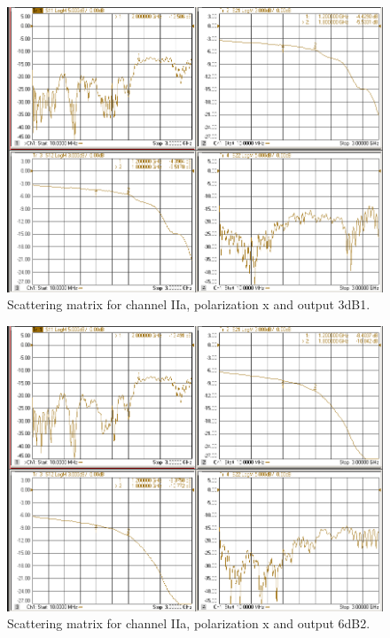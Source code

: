 \documentclass[12pt,a4paper,oneside]{article}
\begin{document}
\begin{figure}[H]
\centering
\includegraphics[width=0.9\linewidth]{VNA_results/IIax_3dB1.png}
\caption{Scattering matrix for channel IIa, polarization x and output 3dB1.}
\label{fig:IIax_3dB1}
\end{figure}


\begin{figure}[H]
\centering
\includegraphics[width=0.9\linewidth]{VNA_results/IIax_6dB2.png}
\caption{Scattering matrix for channel IIa, polarization x and output 6dB2.}
\label{fig:IIax_6dB2}
\end{figure}
\end{document}
